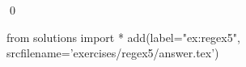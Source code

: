
\begin{ex} 
  \label{ex:regex5}
  
  \qed
\end{ex} 
\begin{python0}
from solutions import *
add(label="ex:regex5",
    srcfilename='exercises/regex5/answer.tex') 
\end{python0}
